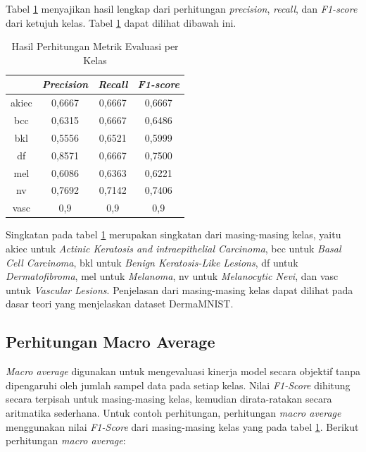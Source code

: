 Tabel \ref{tab:metrik_evaluasi} menyajikan hasil lengkap dari perhitungan \textit{precision}, 
\textit{recall}, dan \textit{F1-score} dari ketujuh kelas. Tabel \ref{tab:metrik_evaluasi} dapat 
dilihat dibawah ini. \par

\begin{table}[h]
    \centering
    \caption{Hasil Perhitungan Metrik Evaluasi per Kelas}
    \label{tab:metrik_evaluasi}
    \begin{tabular}{|c|c|c|c|}
        \hline
        & \textit{Precision} & \textit{Recall} & \textit{F1-score} \\
        \hline
        akiec & 0,6667 & 0,6667 & 0,6667 \\
        \hline
        bcc & 0,6315 & 0,6667 & 0,6486 \\
        \hline
        bkl & 0,5556 & 0,6521 & 0,5999 \\
        \hline
        df & 0,8571 & 0,6667 & 0,7500 \\
        \hline
        mel & 0,6086 & 0,6363 & 0,6221 \\
        \hline
        nv & 0,7692 & 0,7142 & 0,7406 \\
        \hline
        vasc & 0,9 & 0,9 & 0,9 \\
        \hline
    \end{tabular}
\end{table}

Singkatan pada tabel \ref{tab:metrik_evaluasi} merupakan singkatan dari 
masing-masing kelas, yaitu akiec untuk \textit{Actinic Keratosis and intraepithelial Carcinoma}, 
bcc untuk \textit{Basal Cell Carcinoma}, 
bkl untuk \textit{Benign Keratosis-Like Lesions}, 
df untuk \textit{Dermatofibroma}, mel untuk \textit{Melanoma}, 
nv untuk \textit{Melanocytic Nevi}, dan vasc untuk 
\textit{Vascular Lesions}. Penjelasan dari masing-masing kelas dapat 
dilihat pada dasar teori yang menjelaskan dataset DermaMNIST. \par

\subsection{Perhitungan Macro Average} \label{III.Macro_Average}
\textit{Macro average} digunakan untuk mengevaluasi kinerja model secara 
objektif tanpa dipengaruhi oleh jumlah sampel data pada setiap kelas. Nilai 
\textit{F1-Score} dihitung secara terpisah untuk masing-masing kelas, kemudian 
dirata-ratakan secara aritmatika sederhana. Untuk contoh perhitungan, 
perhitungan \textit{macro average} menggunakan nilai \textit{F1-Score} dari 
masing-masing kelas yang pada tabel \ref{tab:metrik_evaluasi}. Berikut perhitungan 
\textit{macro average}: \\ \\

